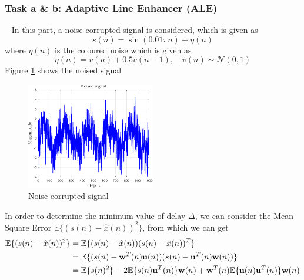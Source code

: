 \documentclass[10pt]{article}
\begin{document}
\subsubsection{Task a \& b: Adaptive Line Enhancer (ALE)} 
\ \indent
In this part, a noise-corrupted signal is considered, which is given as
\begin{equation}
	s(n) = \sin(0.01\pi n) + \eta(n)
\end{equation}
where $\eta(n)$ is the coloured noise which is given as 
\begin{equation}
	\eta(n) = v(n) + 0.5 v(n-1), \quad v(n) \sim \mathcal{N}(0,1)
\end{equation}
Figure \ref{fig14_14} shows the noised signal
\begin{figure}[htbp]
    \centering
	\includegraphics[width=0.5\textwidth]{fig/2.3_3.pdf}

    \caption{Noise-corrupted signal}
	\label{fig14_14}
\end{figure}

In order to determine the minimum value of delay $\Delta$, we can consider the Mean Square Error 
$\mathbb{E}\{ (s(n) - \hat{x}(n))^2 \}$, from which we can get
\begin{align}
	\mathbb{E}\{ (s(n) - \hat{x}(n))^2 \} & = \mathbb{E}\{ (s(n) - \hat{x}(n)) (s(n) - \hat{x}(n))^T \} \nonumber\\
	& = \mathbb{E}\{ ( s(n) - {\bf{w}}^T(n) {\bf{u}}(n)) ( s(n) - {\bf{u}}^T(n) {\bf{w}}(n)) \} \nonumber\\
	& = \mathbb{E}\{ s(n)^2 \} - 2\mathbb{E}\{ s(n) {\bf{u}}^T(n) \} {\bf{w}}(n) + {\bf{w}}^T(n) \mathbb{E}\{ {\bf{u}}(n) {\bf{u}}^T(n) \} {\bf{w}}(n) \label{eq59}
\end{align}
\end{document}

